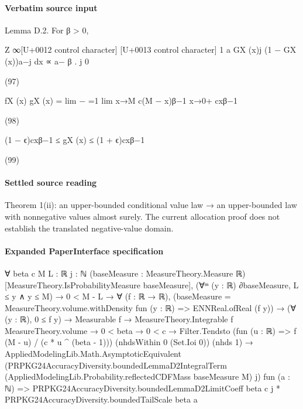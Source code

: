 \documentclass[10pt]{article}
\begin{document}
\paragraph{Verbatim source input}
\begin{ReviewVerbatim}
Lemma D.2. For β > 0,

Z ∞[U+0012 control character] [U+0013 control character]
1
a
GX (x)j (1 − GX (x))a−j dx ∝ a− β .
j
0

(97)

fX (x)
gX (x)
= lim −
=1
lim
x→M c(M − x)β−1
x→0+ cxβ−1

(98)

(1 − ϵ)cxβ−1 ≤ gX (x) ≤ (1 + ϵ)cxβ−1

(99)
\end{ReviewVerbatim}

\paragraph{Settled source reading}
\begin{sloppypar}
Theorem 1(ii):\allowbreak{} an upper-\allowbreak{}bounded conditional value law → an upper-\allowbreak{}bounded law with nonnegative values almost surely.\allowbreak{} The current allocation proof does not establish the translated negative-\allowbreak{}value domain.\allowbreak{}
\end{sloppypar}

\paragraph{Expanded PaperInterface specification}
\begin{ReviewVerbatim}
∀ {beta c M L : ℝ} {j : ℕ} (baseMeasure : MeasureTheory.Measure ℝ) [MeasureTheory.IsProbabilityMeasure baseMeasure],
  (∀ᵐ (y : ℝ) ∂baseMeasure, L ≤ y ∧ y ≤ M) →
    0 < M - L →
      ∀ (f : ℝ → ℝ),
        (baseMeasure = MeasureTheory.volume.withDensity fun (y : ℝ) => ENNReal.ofReal (f y)) →
          (∀ (y : ℝ), 0 ≤ f y) →
            Measurable f →
              MeasureTheory.Integrable f MeasureTheory.volume →
                0 < beta →
                  0 < c →
                    Filter.Tendsto (fun (u : ℝ) => f (M - u) / (c * u ^ (beta - 1))) (nhdsWithin 0 (Set.Ioi 0))
                        (nhds 1) →
                      AppliedModelingLib.Math.AsymptoticEquivalent
                        (PRPKG24AccuracyDiversity.boundedLemmaD2IntegralTerm
                          (AppliedModelingLib.Probability.reflectedCDFMass baseMeasure M) j)
                        fun (a : ℕ) =>
                        PRPKG24AccuracyDiversity.boundedLemmaD2LimitCoeff beta c j *
                          PRPKG24AccuracyDiversity.boundedTailScale beta a
\end{ReviewVerbatim}
\end{document}
